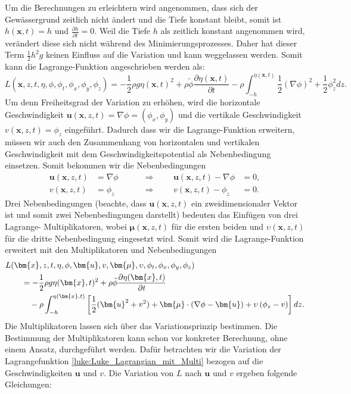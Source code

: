 Um die Berechnungen zu erleichtern wird angenommen, dass sich der Gewässergrund zeitlich nicht ändert und die Tiefe konstant bleibt, somit ist $h(\bm{x},t) = h$ und $\frac{\partial h}{\partial t} = 0$.
Weil die Tiefe $h$ als zeitlich konstant angenommen wird, verändert diese sich nicht während des Minimierungsprozesses.
Daher hat dieser Term $\frac{1}{2}h^2g$ keinen Einfluss auf die Variation und kann weggelassen werden.
Somit kann die Lagrange-Funktion angeschrieben werden als:
\[
L(\bm{x},z,t,\eta,\phi,\phi_t,\phi_x, \phi_y, \phi_z)
= 
-\frac{1}{2}\rho g\eta(\bm{x},t)^2 +\rho \tilde{\phi} \frac{\partial\eta(\bm{x},t)}{\partial t} -\rho \int_{-h}^{\eta(\bm{x},t)} \frac{1}{2}\left(\nabla\phi\right)^2 + \frac{1}{2}\phi_z^2 dz
.\]
Um denn Freiheitsgrad der Variation zu erhöhen, wird die horizontale Geschwindigkeit $\bm{u}(\bm{x},z,t) = \nabla\phi = (\phi_x, \phi_y)$ und die vertikale Geschwindigkeit $v(\bm{x},z,t) = \phi_z$ eingeführt. 
Dadurch dass wir die Lagrange-Funktion erweitern, müssen wir auch den Zusammenhang von horizontalen und vertikalen Geschwindigkeit mit dem Geschwindigkeitspotential als Nebenbedingung einsetzen.
Somit bekommen wir die Nebenbedingungen
\[
\begin{aligned}
\bm{u}(\bm{x},z,t)
&=
\nabla\phi
&&&&\Rightarrow&&&
\bm{u}(\bm{x},z,t)
-
\nabla\phi
&=
0,
\\
v(\bm{x},z,t)
&=
\phi_z
&&&&\Rightarrow&&&
v(\bm{x},z,t)
-
\phi_z
&=
0.
\end{aligned}
\]
Drei Nebenbedingungen (beachte, dass $\bm{u}(\bm{x},z,t)$ ein zweidimensionaler Vektor ist und somit zwei Nebenbedingungen darstellt) bedeuten das Einfügen von drei Lagrange- Multiplikatoren, wobei $\bm{\mu}(\bm{x},z,t)$ für die ersten beiden und $\upsilon(\bm{x},z,t)$ für die dritte Nebenbedingung eingesetzt wird.
Somit wird die Lagrange-Funktion erweitert mit den Multiplikatoren und Nebenbedingungen
\begin{align}
&L(\bm{x},z,t,\eta,\phi,\bm{u}, v, \bm{\mu},\upsilon,\phi_t,\phi_x,\phi_y,\phi_z)
\notag
\\
&\qquad=
	-
	\frac{1}{2}\rho  g \eta(\bm{x},t)^2
	+
	\rho \tilde{\phi} \frac{\partial\eta(\bm{x},t)}{\partial t}
	\notag
\\
&\qquad\quad
	-
	\rho \int_{-h}^{\eta(\bm{x},t)} \left[ \frac{1}{2} (\bm{u}^2 + v^2) + \bm{\mu} \cdot (\nabla\phi - \bm{u}) + \upsilon  \left(\phi_z - v\right) \right] dz.
	\label{luke:Luke_Lagrangian_mit_Multi}
\end{align}
Die Multiplikatoren lassen sich über das Variationsprinzip bestimmen.
Die Bestimmung der Multiplikatoren kann schon vor konkreter Berechnung, ohne einem Ansatz, durchgeführt werden.
Dafür betrachten wir die Variation der Lagrangefunktion \eqref{luke:Luke_Lagrangian_mit_Multi} bezogen auf die Geschwindigkeiten $\bm{u}$ und $v$.
Die Variation von $L$ nach $\bm{u}$ und $v$ ergeben folgende Gleichungen:

